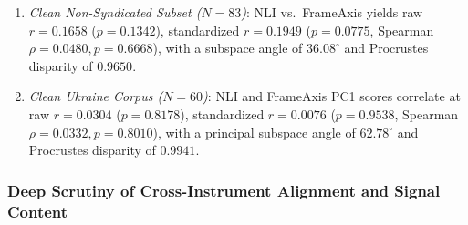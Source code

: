\begin{itemize}
\begin{enumerate}
        \item \emph{Clean Non-Syndicated Subset ($N=83$)}: NLI vs.\ FrameAxis yields raw $r = \mathbf{0.1658}$ ($p = 0.1342$), standardized $r = \mathbf{0.1949}$ ($p = 0.0775$, Spearman $\rho = 0.0480, p = 0.6668$), with a subspace angle of $36.08^\circ$ and Procrustes disparity of $0.9650$.
        \item \emph{Clean Ukraine Corpus ($N=60$)}: NLI and FrameAxis PC1 scores correlate at raw $r = \mathbf{0.0304}$ ($p = 0.8178$), standardized $r = \mathbf{0.0076}$ ($p = 0.9538$, Spearman $\rho = 0.0332, p = 0.8010$), with a principal subspace angle of $62.78^\circ$ and Procrustes disparity of $0.9941$.
    \end{enumerate}
\end{itemize}

\subsubsection{Deep Scrutiny of Cross-Instrument Alignment and Signal Content}

